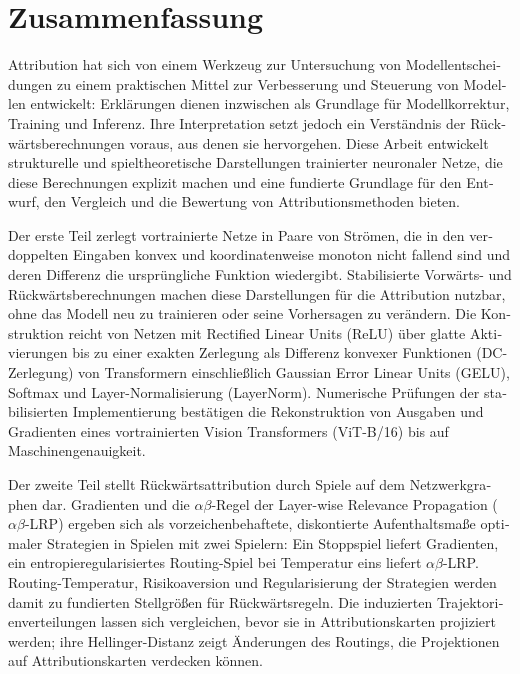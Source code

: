 \chapter*{Zusammenfassung}
\begin{otherlanguage}{ngerman}
Attribution hat sich von einem Werkzeug zur Untersuchung von Modellentscheidungen zu einem praktischen Mittel zur Verbesserung und Steuerung von Modellen entwickelt: Erklärungen dienen inzwischen als Grundlage für Modellkorrektur, Training und Inferenz. Ihre Interpretation setzt jedoch ein Verständnis der Rückwärtsberechnungen voraus, aus denen sie hervorgehen. Diese Arbeit entwickelt strukturelle und spieltheoretische Darstellungen trainierter neuronaler Netze, die diese Berechnungen explizit machen und eine fundierte Grundlage für den Entwurf, den Vergleich und die Bewertung von Attributionsmethoden bieten.

Der erste Teil zerlegt vortrainierte Netze in Paare von Strömen, die in den verdoppelten Eingaben konvex und koordinatenweise monoton nicht fallend sind und deren Differenz die ursprüngliche Funktion wiedergibt. Stabilisierte Vorwärts- und Rückwärtsberechnungen machen diese Darstellungen für die Attribution nutzbar, ohne das Modell neu zu trainieren oder seine Vorhersagen zu verändern. Die Konstruktion reicht von Netzen mit Rectified Linear Units (ReLU) über glatte Aktivierungen bis zu einer exakten Zerlegung als Differenz konvexer Funktionen (DC-Zerlegung) von Transformern einschließlich Gaussian Error Linear Units (GELU), Softmax und Layer-Normalisierung (LayerNorm). Numerische Prüfungen der stabilisierten Implementierung bestätigen die Rekonstruktion von Ausgaben und Gradienten eines vortrainierten Vision Transformers (ViT-B/16) bis auf Maschinengenauigkeit.

Der zweite Teil stellt Rückwärtsattribution durch Spiele auf dem Netzwerkgraphen dar. Gradienten und die $\alpha\beta$-Regel der Layer-wise Relevance Propagation ($\alpha\beta$-LRP) ergeben sich als vorzeichenbehaftete, diskontierte Aufenthaltsmaße optimaler Strategien in Spielen mit zwei Spielern: Ein Stoppspiel liefert Gradienten, ein entropieregularisiertes Routing-Spiel bei Temperatur eins liefert $\alpha\beta$-LRP. Routing-Temperatur, Risikoaversion und Regularisierung der Strategien werden damit zu fundierten Stellgrößen für Rückwärtsregeln. Die induzierten Trajektorienverteilungen lassen sich vergleichen, bevor sie in Attributionskarten projiziert werden; ihre Hellinger-Distanz zeigt Änderungen des Routings, die Projektionen auf Attributionskarten verdecken können.


\end{otherlanguage}
